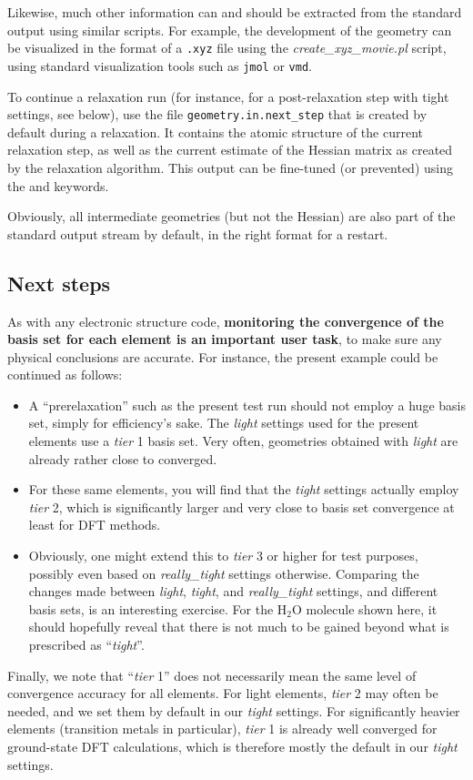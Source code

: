 Likewise, much other information can and should be extracted from the standard
output using similar scripts. For example, the development of the geometry can
be visualized in the format of a \texttt{.xyz} file using the
\emph{create\_xyz\_movie.pl} script, using standard visualization tools such
as \texttt{jmol} or \texttt{vmd}.

To continue a relaxation run (for instance, for a post-relaxation step
with tight settings, see below), use the file
\texttt{geometry.in.next\_step} that is created by default during a
relaxation. It contains the atomic structure of the current relaxation
step, as well as the current estimate of the Hessian matrix as created
by the  relaxation algorithm. This output can be
fine-tuned (or prevented) using the 
and  keywords.

Obviously, all intermediate geometries (but not the Hessian) are also
part of the standard output stream by default, in the right format for
a restart.

\subsection*{Next steps}

As with any electronic structure code, \textbf{monitoring the convergence of
the basis set for each element is an important user task}, to make sure any
physical conclusions are accurate. For instance, the present example could be
continued as follows:
\begin{itemize}
  \item A ``prerelaxation'' such as the present test run should
    not employ a huge basis set, simply for efficiency's sake. The
    \emph{light} settings used for the present elements use a \emph{tier} 1
    basis set. Very often, geometries obtained with \emph{light} are already
    rather close to converged.
  \item For these same elements, you will find that the \emph{tight} settings
    actually employ \emph{tier} 2, which is significantly larger and very
    close to basis set convergence at least for DFT methods. 
  \item Obviously, one might extend this to \emph{tier} 3 or higher for test
    purposes, possibly even based on \emph{really\_tight} settings
    otherwise. Comparing the changes made between \emph{light}, \emph{tight},
    and \emph{really\_tight} settings, and different basis sets, is an 
    interesting exercise. For the H$_2$O molecule shown here, it should
    hopefully reveal that there is not much to be gained beyond what is
    prescribed as ``\emph{tight}''.
\end{itemize}
Finally, we note that ``\emph{tier} 1'' does not necessarily mean the same
level of convergence accuracy for all elements. For light elements,
\emph{tier} 2 may often be needed, and we set them by default in our
\emph{tight} settings. For significantly heavier elements (transition 
metals in particular), \emph{tier} 1  is already well converged for 
ground-state DFT calculations, which is therefore mostly the default in our
\emph{tight} settings. 

